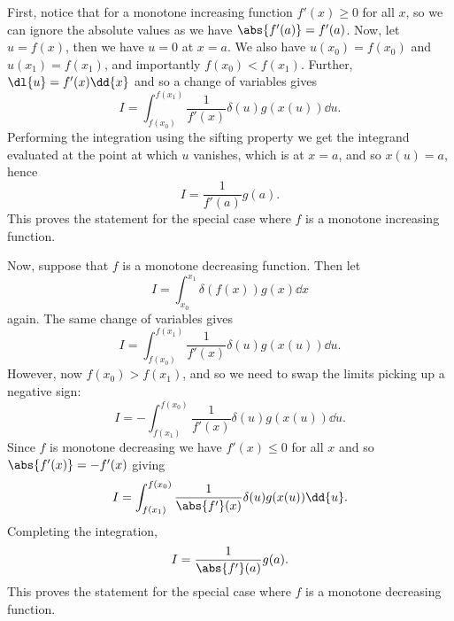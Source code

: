 \documentclass[fleqn]{NotesClass}
\begin{document}
    First, notice that for a monotone increasing function \(f'(x) \ge 0\) for all \(x\), so we can ignore the absolute values as we have \(\abs{f'(a)} = f'(a)\).
    Now, let \(u = f(x)\), then we have \(u = 0\) at \(x = a\).
    We also have \(u(x_0) = f(x_0)\) and \(u(x_1) = f(x_1)\), and importantly \(f(x_0) < f(x_1)\).
    Further, \(\dl{u} = f'(x) \dd{x}\) and so a change of variables gives
    \begin{equation}
        I = \int_{f(x_0)}^{f(x_1)} \frac{1}{f'(x)} \delta(u) g(x(u)) \dd{u}.
    \end{equation}
    Performing the integration using the sifting property we get the integrand evaluated at the point at which \(u\) vanishes, which is at \(x = a\), and so \(x(u) = a\), hence
    \begin{equation}
        I = \frac{1}{f'(a)} g(a).
    \end{equation}
    This proves the statement for the special case where \(f\) is a monotone increasing function.
    
    Now, suppose that \(f\) is a monotone decreasing function.
    Then let
    \begin{equation}
        I = \int_{x_0}^{x_1} \delta(f(x)) g(x) \dd{x}
    \end{equation}
    again.
    The same change of variables gives
    \begin{equation}
        I = \int_{f(x_0)}^{f(x_1)} \frac{1}{f'(x)} \delta(u) g(x(u)) \dd{u}.
    \end{equation}
    However, now \(f(x_0) > f(x_1)\), and so we need to swap the limits picking up a negative sign:
    \begin{equation}
        I = -\int_{f(x_1)}^{f(x_0)} \frac{1}{f'(x)} \delta(u) g(x(u)) \dd{u}.
    \end{equation}
    Since \(f\) is monotone decreasing we have \(f'(x) \le 0\) for all \(x\) and so \(\abs{f'(x)} = -f'(x)\) giving
    \begin{equation}
        I = \int_{f(x_1)}^{f(x_0)} \frac{1}{\abs{f'}(x)} \delta(u) g(x(u)) \dd{u}.
    \end{equation}
    Completing the integration,
    \begin{equation}
        I = \frac{1}{\abs{f'}(a)} g(a).
    \end{equation}
    This proves the statement for the special case where \(f\) is a monotone decreasing function.
    
\end{document}
